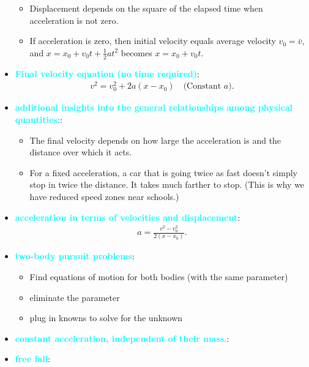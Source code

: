 \documentclass{report}
\begin{document}
\begin{itemize}
            \begin{itemize}
                \item Displacement depends on the square of the elapsed time when acceleration is not zero.
                \item If acceleration is zero, then initial velocity equals average velocity \(v_0 = \bar{v}\), and \(x = x_0 + v_0t + \frac{1}{2}at^2\) becomes \(x = x_0 + v_0t\).
            \end{itemize}
        \item \textbf{\textcolor{cyan}{Final velocity equation (no time required)}}:
            \begin{align*}
                v^{2} = v_{0}^{2} + 2a(x-x_{0}) \quad \text{(Constant $a$)}
            .\end{align*}
        \item \textbf{\textcolor{cyan}{additional insights into the general relationships among physical quantities:}}:
            \begin{itemize}
                \item The final velocity depends on how large the acceleration is and the distance over which it acts.
                \item For a fixed acceleration, a car that is going twice as fast doesn’t simply stop in twice the distance. It takes much farther to stop. (This is why we have reduced speed zones near schools.)
            \end{itemize}
        \item \textbf{\textcolor{cyan}{acceleration in terms of velocities and displacement}}:
            \begin{align*}
                a  = \frac{v^{2} - v_{0}^{2}}{2(x-x_{0})}
            .\end{align*}
        \item \textbf{\textcolor{cyan}{two-body pursuit problems}}:
            \begin{itemize}
                \item Find equations of motion for both bodies (with the same parameter)
                \item eliminate the parameter
                \item plug in knowns to solve for the unknown
            \end{itemize}
        \item \textbf{\textcolor{cyan}{constant acceleration, independent of their mass.}}: 
        \item \textbf{\textcolor{cyan}{free fall}}:

\end{itemize}
\end{document}
